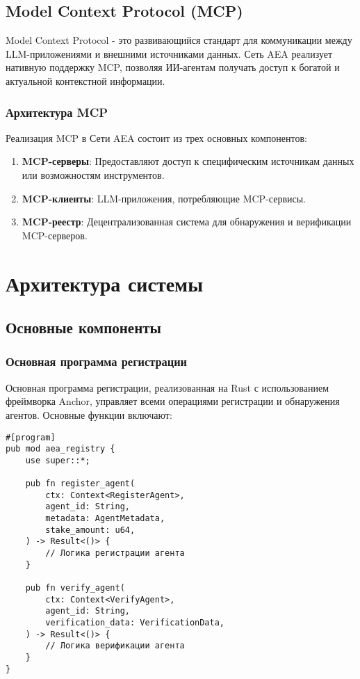 \documentclass[12pt,a4paper]{article}
\begin{document}
\subsection{Model Context Protocol (MCP)}

Model Context Protocol - это развивающийся стандарт для коммуникации между LLM-приложениями и внешними источниками данных. Сеть AEA реализует нативную поддержку MCP, позволяя ИИ-агентам получать доступ к богатой и актуальной контекстной информации.

\subsubsection{Архитектура MCP}

Реализация MCP в Сети AEA состоит из трех основных компонентов:

\begin{enumerate}
\item \textbf{MCP-серверы}: Предоставляют доступ к специфическим источникам данных или возможностям инструментов.
\item \textbf{MCP-клиенты}: LLM-приложения, потребляющие MCP-сервисы.
\item \textbf{MCP-реестр}: Децентрализованная система для обнаружения и верификации MCP-серверов.
\end{enumerate}

\section{Архитектура системы}

\subsection{Основные компоненты}

\subsubsection{Основная программа регистрации}

Основная программа регистрации, реализованная на Rust с использованием фреймворка Anchor, управляет всеми операциями регистрации и обнаружения агентов. Основные функции включают:

\begin{verbatim}
#[program]
pub mod aea_registry {
    use super::*;
    
    pub fn register_agent(
        ctx: Context<RegisterAgent>,
        agent_id: String,
        metadata: AgentMetadata,
        stake_amount: u64,
    ) -> Result<()> {
        // Логика регистрации агента
    }
    
    pub fn verify_agent(
        ctx: Context<VerifyAgent>,
        agent_id: String,
        verification_data: VerificationData,
    ) -> Result<()> {
        // Логика верификации агента
    }
}
\end{verbatim}
\end{document}
